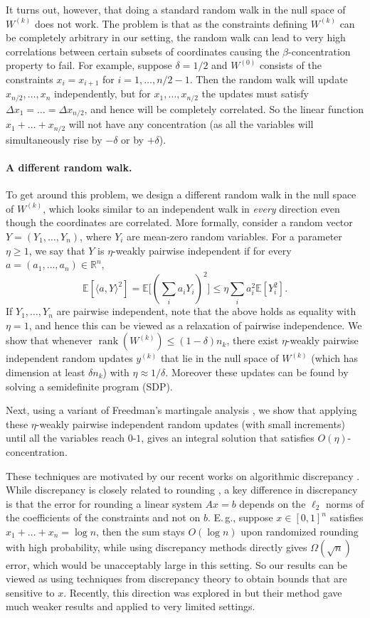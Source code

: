 \documentclass[11pt]{article}
\newcommand{\rank}{\operatorname{rank}}
\newcommand{\ip}[1]{\langle #1 \rangle}
\newcommand{\E}{\mathbb{E}}
\theoremstyle{definition}
\newcommand{\R}{{\mathbb R}}
\newcommand{\Eg}{E.\,g.}
\begin{document}
It turns out, however,  %
 that doing a standard random walk in the null space of $W^{(k)}$ does not work. The problem is that as the constraints defining $W^{(k)}$
can be completely arbitrary in our setting, the random walk can lead to very high correlations between certain subsets of coordinates causing the $\beta$-concentration property to fail. For example, suppose $\delta=1/2$ and $W^{(0)}$ consists of the constraints $x_i=x_{i+1}$ for $i=1,\ldots,n/2-1$. Then the random walk will update $x_{n/2},\ldots,x_n$ independently, but for $x_1,\ldots,x_{n/2}$ the updates must satisfy $\Delta x_1 = \ldots = \Delta x_{n/2}$, and hence will be completely correlated. So the linear function $x_1 + \ldots + x_{n/2}$ will not have any concentration (as all the  variables will simultaneously rise by $-\delta$ or by $+\delta$).

\paragraph{A different random walk.} To get around this problem, we design a different random walk in the null space of $W^{(k)}$, which looks similar to an independent walk  in \emph{every} direction even though the coordinates are correlated.
More formally, consider a random vector $Y=(Y_1,\ldots,Y_n)$, where $Y_i$ are mean-zero random variables. For a parameter $\eta \geq 1$, we say
that $Y$ is $\eta$-weakly pairwise independent
if for every $a=(a_1,\ldots,a_n) \in \R^n$,
 \[ \E[ \ip{ a, Y}^2  ]  =  \E \Big[(\sum_i a_i Y_i)^2 \Big]\leq  \eta  \sum_i a_i^2 \E[Y_i^2]. \]
If $Y_1,\ldots,Y_n$ are pairwise independent, note that the above holds as equality  with $\eta=1$, and hence  this can be viewed as a relaxation of pairwise independence.
We show that whenever $\rank(W^{(k)}) \leq (1-\delta) n_k$, there exist $\eta$-weakly pairwise independent random updates $y^{(k)}$ that lie in the null space of $W^{(k)}$ (which has dimension at least $\delta n_k$) with $\eta \approx 1/\delta$.
%
%
Moreover these updates can be found by solving a semidefinite program (SDP).

Next, using a variant of Freedman's martingale analysis \cite{Freedman}, we show that applying these $\eta$-weakly pairwise independent random
updates (with small increments) until all the variables reach $0$-$1$, gives an integral solution that satisfies $O(\eta)$-concentration.

These techniques are motivated by our recent works
on algorithmic discrepancy \cite{BDG16, BG17}.
While discrepancy is closely related to rounding
\cite{LSV86, R12}, a key difference in discrepancy is that the error for
rounding a linear system $Ax=b$ depends on the $\ell_2$ norms of the coefficients of the constraints and not
on $b$. \Eg, suppose $x \in [0,1]^n$ satisfies  $x_1 + \ldots + x_n = \log n$, then the sum stays
$O(\log n)$ upon randomized rounding with high probability, while
using discrepancy methods directly gives $\Omega(\sqrt{n})$ error, which would be unacceptably large in this setting. So our results can be
viewed as using techniques from discrepancy theory %
to obtain bounds that are sensitive to $x$.
Recently, this direction was explored in \cite{BN16}
but their method gave much weaker results and applied to very limited settings.
\end{document}
